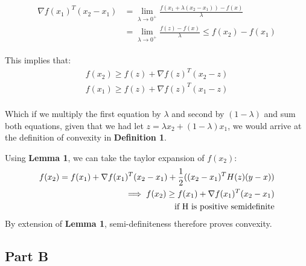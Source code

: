 \documentclass[11pt]{article}
\begin{document}
\begin{align}
	\begin{split}
		\nabla f(x_1)^T(x_2-x_1) &= \lim_{\lambda \rightarrow 0^+}\frac{f(x_1+\lambda(x_2-x_1))-f(x)}{\lambda} \\
		&= \lim_{\lambda \rightarrow 0^+}\frac{f(z)-f(x)}{\lambda} \leq f(x_2) - f(x_1)
	\end{split}
\end{align}

This implies that:
\begin{align}
	f(x_2) \geq f(z) + \nabla f(z)^T(x_2-z) \\
	f(x_1) \geq f(z) + \nabla f(z)^T(x_1-z) \\
\end{align}

Which if we multiply the first equation by $\lambda$ and second by $(1-\lambda)$ and sum both equations, 
given that we had let $z=\lambda x_2 + (1-\lambda)x_1$,  we would arrive at the definition of convexity in
\textbf{Definition 1}.

Using \textbf{Lemma 1}, we can take the taylor expansion of $f(x_2)$:
\begin{align}
	\begin{split}
	f(x_2) = f(x_1) + \nabla f(x_1)^T(x_2-x_1) + \frac{1}{2}((x_2-x_1)^TH(z)(y-x)) \\
	\implies f(x_2) \geq f(x_1) + \nabla f(x_1)^T(x_2-x_1) \\ 
	\textnormal{if H is positive semidefinite}
	\end{split}
\end{align}
By extension of \textbf{Lemma 1}, semi-definiteness therefore proves convexity. 


\subsection*{Part B}







\end{document}
